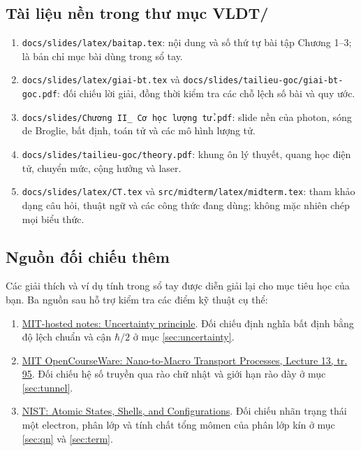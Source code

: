 \documentclass[11pt,a4paper]{article}
\begin{document}
\subsection{Tài liệu nền trong thư mục VLDT/}
\begin{enumerate}
\item \texttt{docs/slides/latex/baitap.tex}: nội dung và số thứ tự bài tập
Chương 1--3; là bản chỉ mục bài dùng trong sổ tay.
\item \texttt{docs/slides/latex/giai-bt.tex} và
\texttt{docs/slides/tailieu-goc/giai-bt-goc.pdf}: đối chiếu lời giải,
đồng thời kiểm tra các chỗ lệch số bài và quy ước.
\item \texttt{docs/slides/Chương II\_ Cơ học lượng tử.pdf}:
slide nền của photon, sóng de Broglie, bất định, toán tử và các mô hình lượng tử.
\item \texttt{docs/slides/tailieu-goc/theory.pdf}:
khung ôn lý thuyết, quang học điện tử, chuyển mức, cộng hưởng và laser.
\item \texttt{docs/slides/latex/CT.tex} và
\texttt{src/midterm/latex/midterm.tex}: tham khảo dạng câu hỏi, thuật ngữ
và các công thức đang dùng; không mặc nhiên chép mọi biểu thức.
\end{enumerate}

\subsection{Nguồn đối chiếu thêm}
Các giải thích và ví dụ tính trong sổ tay được diễn giải lại cho mục tiêu
học của bạn. Ba nguồn sau hỗ trợ kiểm tra các điểm kỹ thuật cụ thể:
\begin{enumerate}
\item \href{https://www.mit.edu/~ashrstnv/uncertainty-principle.html}{MIT-hosted notes: Uncertainty principle}.
Đối chiếu định nghĩa bất định bằng độ lệch chuẩn và cận $\hbar/2$
ở mục \ref{sec:uncertainty}.
\item \href{https://ocw.mit.edu/courses/2-57-nano-to-macro-transport-processes-spring-2012/2e4ecaa5cf55f03bcefbc8ccce79aed6_MIT2_57S12_lec_notes_2004.pdf}{MIT OpenCourseWare: Nano-to-Macro Transport Processes, Lecture 13, tr. 95}.
Đối chiếu hệ số truyền qua rào chữ nhật và giới hạn rào dày
ở mục \ref{sec:tunnel}.
\item \href{https://physics.nist.gov/Pubs/AtSpec/node03.html}{NIST: Atomic States, Shells, and Configurations}.
Đối chiếu nhãn trạng thái một electron, phân lớp và tính chất tổng
mômen của phân lớp kín ở mục \ref{sec:qn} và \ref{sec:term}.
\end{enumerate}
\end{document}
